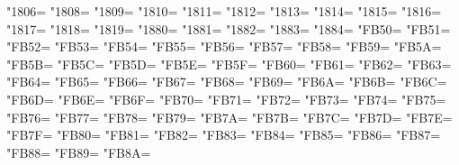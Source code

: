 \XeTeXcharclass"1806=\KclassArabU
\XeTeXcharclass"1808=\KclassArabU
\XeTeXcharclass"1809=\KclassArabU
\XeTeXcharclass"1810=\KclassArabU
\XeTeXcharclass"1811=\KclassArabU
\XeTeXcharclass"1812=\KclassArabU
\XeTeXcharclass"1813=\KclassArabU
\XeTeXcharclass"1814=\KclassArabU
\XeTeXcharclass"1815=\KclassArabU
\XeTeXcharclass"1816=\KclassArabU
\XeTeXcharclass"1817=\KclassArabU
\XeTeXcharclass"1818=\KclassArabU
\XeTeXcharclass"1819=\KclassArabU
\XeTeXcharclass"1880=\KclassArabU
\XeTeXcharclass"1881=\KclassArabU
\XeTeXcharclass"1882=\KclassArabU
\XeTeXcharclass"1883=\KclassArabU
\XeTeXcharclass"1884=\KclassArabU
\XeTeXcharclass"FB50=\KclassArabU
\XeTeXcharclass"FB51=\KclassArabU
\XeTeXcharclass"FB52=\KclassArabU
\XeTeXcharclass"FB53=\KclassArabU
\XeTeXcharclass"FB54=\KclassArabU
\XeTeXcharclass"FB55=\KclassArabU
\XeTeXcharclass"FB56=\KclassArabU
\XeTeXcharclass"FB57=\KclassArabU
\XeTeXcharclass"FB58=\KclassArabU
\XeTeXcharclass"FB59=\KclassArabU
\XeTeXcharclass"FB5A=\KclassArabU
\XeTeXcharclass"FB5B=\KclassArabU
\XeTeXcharclass"FB5C=\KclassArabU
\XeTeXcharclass"FB5D=\KclassArabU
\XeTeXcharclass"FB5E=\KclassArabU
\XeTeXcharclass"FB5F=\KclassArabU
\XeTeXcharclass"FB60=\KclassArabU
\XeTeXcharclass"FB61=\KclassArabU
\XeTeXcharclass"FB62=\KclassArabU
\XeTeXcharclass"FB63=\KclassArabU
\XeTeXcharclass"FB64=\KclassArabU
\XeTeXcharclass"FB65=\KclassArabU
\XeTeXcharclass"FB66=\KclassArabU
\XeTeXcharclass"FB67=\KclassArabU
\XeTeXcharclass"FB68=\KclassArabU
\XeTeXcharclass"FB69=\KclassArabU
\XeTeXcharclass"FB6A=\KclassArabU
\XeTeXcharclass"FB6B=\KclassArabU
\XeTeXcharclass"FB6C=\KclassArabU
\XeTeXcharclass"FB6D=\KclassArabU
\XeTeXcharclass"FB6E=\KclassArabU
\XeTeXcharclass"FB6F=\KclassArabU
\XeTeXcharclass"FB70=\KclassArabU
\XeTeXcharclass"FB71=\KclassArabU
\XeTeXcharclass"FB72=\KclassArabU
\XeTeXcharclass"FB73=\KclassArabU
\XeTeXcharclass"FB74=\KclassArabU
\XeTeXcharclass"FB75=\KclassArabU
\XeTeXcharclass"FB76=\KclassArabU
\XeTeXcharclass"FB77=\KclassArabU
\XeTeXcharclass"FB78=\KclassArabU
\XeTeXcharclass"FB79=\KclassArabU
\XeTeXcharclass"FB7A=\KclassArabU
\XeTeXcharclass"FB7B=\KclassArabU
\XeTeXcharclass"FB7C=\KclassArabU
\XeTeXcharclass"FB7D=\KclassArabU
\XeTeXcharclass"FB7E=\KclassArabU
\XeTeXcharclass"FB7F=\KclassArabU
\XeTeXcharclass"FB80=\KclassArabU
\XeTeXcharclass"FB81=\KclassArabU
\XeTeXcharclass"FB82=\KclassArabU
\XeTeXcharclass"FB83=\KclassArabU
\XeTeXcharclass"FB84=\KclassArabU
\XeTeXcharclass"FB85=\KclassArabU
\XeTeXcharclass"FB86=\KclassArabU
\XeTeXcharclass"FB87=\KclassArabU
\XeTeXcharclass"FB88=\KclassArabU
\XeTeXcharclass"FB89=\KclassArabU
\XeTeXcharclass"FB8A=\KclassArabU
